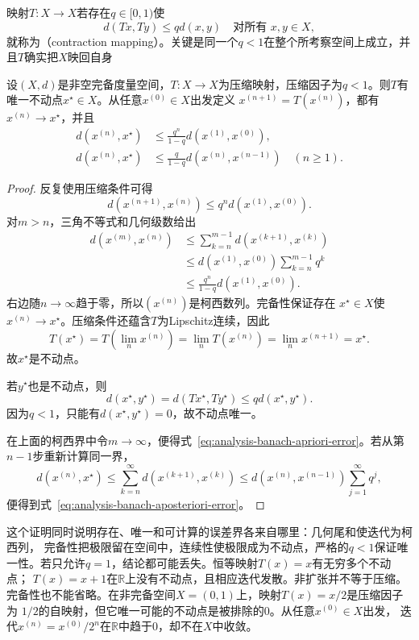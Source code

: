 映射$T:X\to X$若存在$q\in[0,1)$使
\begin{equation}
  d(Tx,Ty)\leq qd(x,y)
  \quad\text{对所有 }x,y\in X,
\label{eq:analysis-contraction-definition}
\end{equation}
就称为（contraction mapping）。关键是同一个$q<1$在整个所考察空间上成立，并且$T$确实把$X$映回自身
\begin{theorem}[Banach压缩映射定理]
\label{thm:analysis-banach-fixed-point}
设$(X,d)$是非空完备度量空间，$T:X\to X$为压缩映射，压缩因子为$q<1$。则$T$有
唯一不动点$x^\star\in X$。从任意$x^{(0)}\in X$出发定义
$x^{(n+1)}=T(x^{(n)})$，都有$x^{(n)}\to x^\star$，并且
\begin{align}
  d(x^{(n)},x^\star)
  &\leq
  \frac{q^n}{1-q}d(x^{(1)},x^{(0)}),
\label{eq:analysis-banach-apriori-error}\\
  d(x^{(n)},x^\star)
  &\leq
  \frac{q}{1-q}d(x^{(n)},x^{(n-1)})
  \quad(n\geq1).
\label{eq:analysis-banach-aposteriori-error}
\end{align}
\end{theorem}
\begin{proof}
反复使用压缩条件可得
\[   d(x^{(n+1)},x^{(n)})   \leq   q^n d(x^{(1)},x^{(0)}). \]
对$m>n$，三角不等式和几何级数给出
\begin{align*}
  d(x^{(m)},x^{(n)})
  &\leq
  \sum_{k=n}^{m-1}d(x^{(k+1)},x^{(k)})\\
  &\leq
  d(x^{(1)},x^{(0)})\sum_{k=n}^{m-1}q^k\\
  &\leq
  \frac{q^n}{1-q}d(x^{(1)},x^{(0)}).
\end{align*}
右边随$n\to\infty$趋于零，所以$(x^{(n)})$是柯西数列。完备性保证存在
$x^\star\in X$使$x^{(n)}\to x^\star$。压缩条件还蕴含$T$为Lipschitz连续，因此
\[   T(x^\star)   =   T\left(\lim_nx^{(n)}\right)   =   \lim_nT(x^{(n)})   =   \lim_nx^{(n+1)}   =   x^\star. \]
故$x^\star$是不动点。

若$y^\star$也是不动点，则
\[   d(x^\star,y^\star)   =   d(Tx^\star,Ty^\star)   \leq qd(x^\star,y^\star). \]
因为$q<1$，只能有$d(x^\star,y^\star)=0$，故不动点唯一。

在上面的柯西界中令$m\to\infty$，便得式~\eqref{eq:analysis-banach-apriori-error}。若从第$n-1$步重新计算同一界，
\[   d(x^{(n)},x^\star)   \leq   \sum_{k=n}^{\infty}d(x^{(k+1)},x^{(k)})   \leq   d(x^{(n)},x^{(n-1)})\sum_{j=1}^{\infty}q^j, \]
便得到式~\eqref{eq:analysis-banach-aposteriori-error}。
\end{proof}

这个证明同时说明存在、唯一和可计算的误差界各来自哪里：几何尾和使迭代为柯西列， 完备性把极限留在空间中，连续性使极限成为不动点，严格的$q<1$保证唯一性。若只允许$q=1$，结论都可能丢失。恒等映射$T(x)=x$有无穷多个不动点； $T(x)=x+1$在$\mathbb{R}$上没有不动点，且相应迭代发散。非扩张并不等于压缩。
完备性也不能省略。在非完备空间$X=(0,1)$上，映射$T(x)=x/2$是压缩因子为
$1/2$的自映射，但它唯一可能的不动点是被排除的$0$。从任意$x^{(0)}\in X$出发，
迭代$x^{(n)}=x^{(0)}/2^n$在$\mathbb{R}$中趋于$0$，却不在$X$中收敛。
